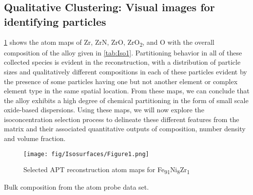 	\subsection*{Qualitative Clustering: Visual images for identifying particles}
		\ref{fig:Iso1} shows the atom maps of Zr, ZrN, ZrO, ZrO\textsubscript{2}, and O with the overall composition of the alloy given in \ref{tab:Iso1}. Partitioning behavior in all of these collected species is evident in the reconstruction, with a distribution of particle sizes and qualitatively different compositions in each of these particles evident by the presence of some particles having one but not another element or complex element type in the same spatial location. From these maps, we can conclude that the alloy exhibits a high degree of chemical partitioning in the form of small scale oxide-based dispersions. Using these maps, we will now explore the isoconcentration selection process to delineate these different features from the matrix and their associated quantitative outputs of composition, number density and volume fraction.
	
		\begin{figure}
			\centering
			\texttt{[image: fig/Isosurfaces/Figure1.png]}
			\caption{Selected APT reconstruction atom maps for Fe\textsubscript{91}Ni\textsubscript{8}Zr\textsubscript{1}}
			\label{fig:Iso1}
		\end{figure}
		
		\begin{table}[]
			\caption{Bulk composition from the atom probe data set.}
			
			\label{tab:Iso1}
		\end{table}

